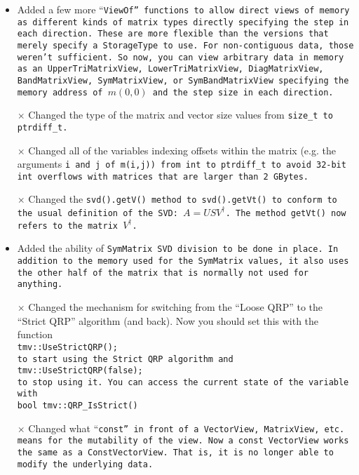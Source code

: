 \begin{description}
\begin{itemize}
\item 
Added a few more ``\tt{ViewOf}'' functions to allow direct views of memory as different kinds of matrix types directly specifying the step in each direction.  These are more flexible than the versions that merely specify a \tt{StorageType} to use.  For non-contiguous data, those weren't sufficient.  So now, you can view arbitrary data in memory as an \tt{UpperTriMatrixView}, \tt{LowerTriMatrixView},
\tt{DiagMatrixView}, \tt{BandMatrixView}, \tt{SymMatrixView}, or \tt{SymBandMatrixView} specifying the memory address of $m(0,0)$ and the step size in each direction.

\item[$\times$]
Changed the type of the matrix and vector size values from \tt{size\_t} to \tt{ptrdiff\_t}. 

\item[$\times$]
Changed all of the variables indexing offsets within the matrix (e.g. the arguments \tt{i} and \tt{j} of \tt{m(i,j)}) from \tt{int} to \tt{ptrdiff\_t} to avoid 32-bit \tt{int} overflows with matrices that are larger than 2 GBytes.  

\item[$\times$]
Changed the \tt{svd().getV()} method to \tt{svd().getVt()} to conform to the
usual definition of the SVD: $A = U S V^\dagger$.  The method \tt{getVt()} now refers to the matrix $V^\dagger$.  

\item
Added the ability of \tt{SymMatrix} SVD division to be done in place.
In addition to the memory used for the \tt{SymMatrix} values, it also uses 
the other half of the matrix that is normally not used for anything.

\item[$\times$]
Changed the mechanism for switching from the ``Loose QRP'' to the ``Strict QRP''
algorithm (and back).  Now you should set this with the function\\
\tt{tmv::UseStrictQRP();}\\
to start using the Strict QRP algorithm and\\
\tt{tmv::UseStrictQRP(false);}\\
to stop using it.  You can access the current state of the variable with\\
\tt{bool tmv::QRP_IsStrict()}

\item[$\times$]
Changed what ``\tt{const}'' in front of a \tt{VectorView},
\tt{MatrixView}, etc. means for the mutability of the view. 
Now a \tt{const VectorView} works the same as a 
\tt{ConstVectorView}.
That is, it is no longer able to modify the underlying data.


\end{itemize}
\end{description}
